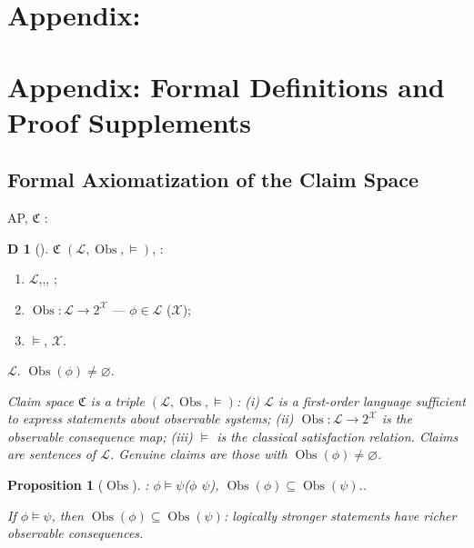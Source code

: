 \documentclass[12pt,a4paper]{article}
\theoremstyle{plain}
\newtheorem{proposition}[theorem]{Proposition}
\theoremstyle{definition}
\newtheorem{definition}[theorem]Definition
\theoremstyle{remark}
\newcommand{\X}{\mathcal{X}}
\newcommand{\ClaimSpace}{\mathfrak{C}}
\newcommand{\Null}{\varnothing}
\DeclareMathOperator{\ObsSet}{Obs}
\begin{document}
\section{Appendix:}
\section{Appendix: Formal Definitions and Proof Supplements}
\subsection{}
\subsection{Formal Axiomatization of the Claim Space}
AP, $\ClaimSpace$ : 
\begin{definition}[]\label{def:claim_space}
 $\ClaimSpace$ $(\mathcal{L}, \ObsSet, \models)$, : 
\begin{enumerate}[label=(\roman*)]
 \item $\mathcal{L}$,,, ; 
 \item $\ObsSet: \mathcal{L} \to 2^{\X}$ --- $\phi \in \mathcal{L}$ ($\X$); 
 \item $\models$, $\X$.
\end{enumerate}
 $\mathcal{L}$. $\ObsSet(\phi) \neq \Null$.
\end{definition}
\vspace{4pt}
\noindent
\textit{Claim space $\ClaimSpace$ is a triple $(\mathcal{L}, \ObsSet, \models)$: (i) $\mathcal{L}$ is a first-order language sufficient to express statements about observable systems; (ii) $\ObsSet: \mathcal{L} \to 2^{\X}$ is the observable consequence map; (iii) $\models$ is the classical satisfaction relation. Claims are sentences of $\mathcal{L}$. Genuine claims are those with $\ObsSet(\phi) \neq \Null$.}
\begin{proposition}[$\ObsSet$]\label{prop:obs_monotone}
: $\phi \models \psi$($\phi$ $\psi$), $\ObsSet(\phi) \subseteq \ObsSet(\psi)$..
\end{proposition}
\vspace{4pt}
\noindent
\textit{If $\phi \models \psi$, then $\ObsSet(\phi) \subseteq \ObsSet(\psi)$: logically stronger statements have richer observable consequences.}
\subsection{}
\end{document}

